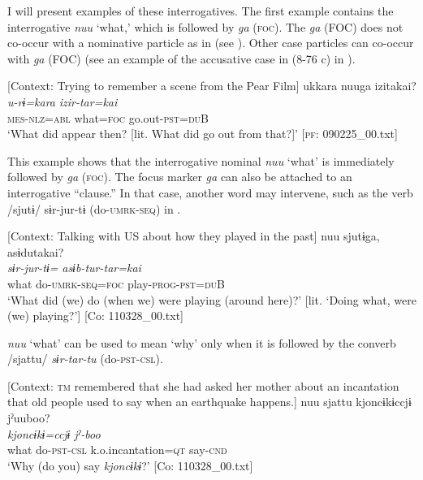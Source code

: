   I will present examples of these interrogatives. The first example contains the interrogative \textit{nuu} ‘what,’ which is followed by \textit{ga} (\textsc{foc}). The \textit{ga} (FOC) does not co-occur with a nominative particle as in  (see ). Other case particles can co-occur with \textit{ga} (FOC) (see an example of the accusative case in (8-76 c) in ).

\ea \label{ex:5:31}   [Context: Trying to remember a scene from the Pear Film]
\glll  ukkara  nuuga  izitakai?\\
\textit{u-rɨ=kara}  \textit{}  \textit{izir-tar=kai}\\
\textsc{mes}-\textsc{nlz}=\textsc{abl}  what=\textsc{foc}  go.out-\textsc{pst}=\textsc{du}B\\
\glt ‘What did appear then? [lit. What did go out from that?]’ [\textsc{pf}: 090225\_00.txt]
\z

This example shows that the interrogative nominal \textit{nuu} ‘what’ is immediately followed by \textit{ga} (\textsc{foc}). The focus marker \textit{ga} can also be attached to an interrogative “clause.” In that case, another word may intervene, such as the verb /sjutɨ/ sɨr-jur-tɨ (do-\textsc{umrk}-\textsc{seq}) in .

\ea \label{ex:5:32}   [Context: Talking with US about how they played in the past]
\glll  nuu  sjutɨga,  asɨdutakai?\\
\textit{}  \textit{sɨr-jur-tɨ=}  \textit{asɨb-tur-tar=kai}\\
what  do-\textsc{umrk}-\textsc{seq}=\textsc{foc}  play-\textsc{prog}-\textsc{pst}=\textsc{du}B\\
\glt ‘What did (we) do (when we) were playing (around here)?’ [lit. ‘Doing what, were (we) playing?’] [Co: 110328\_00.txt]
\z

\textit{nuu} ‘what’ can be used to mean ‘why’ only when it is followed by the converb /sjattu/ \textit{sɨr-tar-tu} (do-\textsc{pst}-\textsc{csl}).

\ea \label{ex:5:33}   [Context: \textsc{tm} remembered that she had asked her mother about an incantation that old people used to say when an earthquake happens.]
\glll  nuu  sjattu  {\textbar}kjoncɨkɨ{\textbar}ccjɨ  jˀuuboo?\\
\textit{}  \textit{}  \textit{kjoncɨkɨ=ccjɨ}  \textit{jˀ-boo}\\
what  do-\textsc{pst}-\textsc{csl}  k.o.incantation=\textsc{qt}  say-\textsc{cnd}\\
\glt ‘Why (do you) say \textit{kjoncɨkɨ}?’ [Co: 110328\_00.txt]
\z


